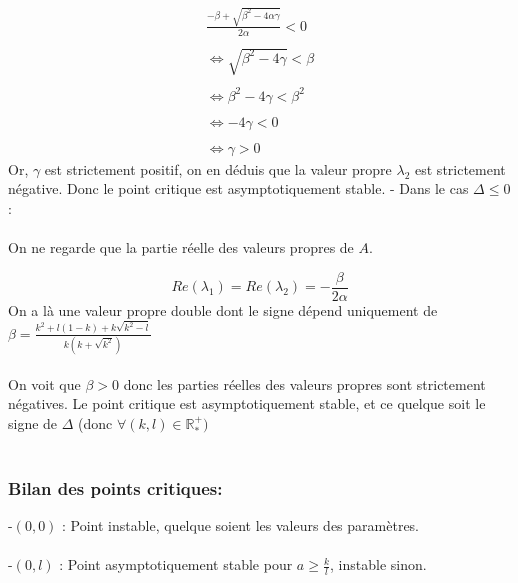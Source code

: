 \documentclass{article}
\begin{document}
\begin{equation*}
    \begin{array}{ll}
        \frac{- \beta + \sqrt{\beta^{2} - 4 \alpha \gamma}}{2\alpha} < 0 \\ \\
        \iff \sqrt{\beta^{2} - 4 \gamma } < \beta \\ \\ \iff
        \beta^{2} - 4 \gamma < \beta^{2} \\\\ \iff
        -4 \gamma < 0 \\\\ \iff
        \gamma > 0 
    \end{array}
\end{equation*}
Or, $\gamma$ est strictement positif, on en déduis que la valeur propre $\lambda_{2}$ est strictement négative. Donc le point critique est asymptotiquement stable.
\newpage
\noindent
- Dans le cas $\Delta \leqslant 0$ : \\ \\ 
On ne regarde que la partie réelle des valeurs propres de $A$.

\begin{equation*}
    Re (\lambda_{1}) = Re(\lambda_{2}) = - \frac{\beta}{2\alpha} 
\end{equation*}
On a là une valeur propre double dont le signe dépend uniquement de $\beta =  \frac{k^{2} + l(1-k) + k \sqrt{k^{2} - l}}{k(k + \sqrt{k^{2} })}$ \\ \\
On voit que $\beta > 0$ donc les parties réelles des valeurs propres sont strictement négatives. Le point critique est asymptotiquement stable, et ce quelque soit le signe de $\Delta $ (donc $ \forall  (k,l)\in \mathbb{R}^{+}_{*})$\\\\

\subsubsection{Bilan des points critiques:}
\noindent
-$(0,0)$ : Point instable, quelque soient les valeurs des paramètres.\\\\

\noindent
-$(0,l)$ : Point asymptotiquement stable pour $ a \geqslant \frac{k}{l} $, instable sinon.\\\\
\end{document}
